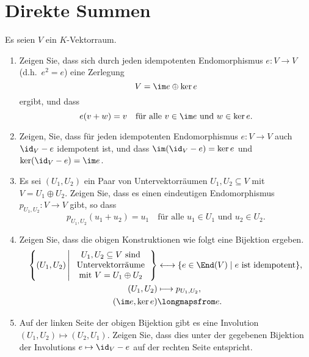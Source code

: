 \section{Direkte Summen}


\begin{question}
  Es seien $V$ ein $K$-Vektorraum.
  \begin{enumerate}[leftmargin=*]
    \item
      Zeigen Sie, dass sich durch jeden idempotenten Endomorphismus $e \colon V \to V$ (d.h.\ $e^2 = e$) eine Zerlegung
      \[
        V = \im e \oplus \ker e
      \]
      ergibt, und dass
      \[
        e(v + w) = v
        \quad
        \text{für alle $v \in \im e$ und $w \in \ker e$}.
      \]
    \item
      Zeigen, Sie, dass für jeden idempotenten Endomorphismus $e \colon V \to V$ auch $\id_V - e$ idempotent ist, und dass $\im (\id_V - e) = \ker e$ und $\ker (\id_V - e) = \im e$.
    \item
      Es sei $(U_1, U_2)$ ein Paar von Untervektorräumen $U_1, U_2 \subseteq V$ mit $V = U_1 \oplus U_2$.
      Zeigen Sie, dass es einen eindeutigen Endomorphismus $p_{U_1, U_2} \colon V \to V$ gibt, so dass
      \[
          p_{U_1, U_2}(u_1 + u_2)
        = u_1
        \quad
        \text{für alle $u_1 \in U_1$ und $u_2 \in U_2$}.
      \]
    \item
      Zeigen Sie, dass die obigen Konstruktionen wie folgt eine Bijektion ergeben.
      \begin{align*}
        \left\{
          (U_1, U_2)
          \,\middle|\,
          \begin{tabular}{c}
            $U_1, U_2 \subseteq V$ sind \\
            Untervektorräume            \\
            mit $V = U_1 \oplus U_2$
          \end{tabular}
        \right\}
        &\longleftrightarrow
        \{ e \in \End(V) \mid \text{$e$ ist idempotent} \},
      \\
        (U_1, U_2) &\longmapsto p_{U_1, U_2},
      \\
        (\im e, \ker e) &\longmapsfrom e.
      \end{align*}
    \item
      Auf der linken Seite der obigen Bijektion gibt es eine Involution $(U_1, U_2) \mapsto (U_2, U_1)$.
      Zeigen Sie, dass dies unter der gegebenen Bijektion der Involutions $e \mapsto \id_V - e$ auf der rechten Seite entspricht.
  \end{enumerate}
\end{question}


